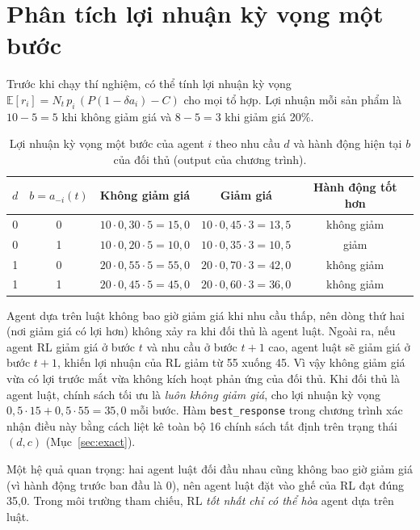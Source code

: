 \documentclass[12pt,a4paper]{report}
\begin{document}
\section{Phân tích lợi nhuận kỳ vọng một bước}
Trước khi chạy thí nghiệm, có thể tính lợi nhuận kỳ vọng
$\mathbb E[r_i]=N_t\,p_i\,(P(1-\delta a_i)-C)$ cho mọi tổ hợp. Lợi nhuận mỗi sản
phẩm là $10-5=5$ khi không giảm giá và $8-5=3$ khi giảm giá 20\%.

\begin{table}[H]
\centering
\small
\caption{Lợi nhuận kỳ vọng một bước của agent $i$ theo nhu cầu $d$ và hành động hiện tại $b$ của đối thủ (output của chương trình).}
\label{tab:onestep}
\begin{tabular}{ccccc}
\toprule
$d$ & $b=a_{-i}(t)$ & Không giảm giá & Giảm giá & Hành động tốt hơn \\
\midrule
0 & 0 & $10\cdot0{,}30\cdot5=15{,}0$ & $10\cdot0{,}45\cdot3=13{,}5$ & không giảm \\
0 & 1 & $10\cdot0{,}20\cdot5=10{,}0$ & $10\cdot0{,}35\cdot3=10{,}5$ & giảm \\
1 & 0 & $20\cdot0{,}55\cdot5=55{,}0$ & $20\cdot0{,}70\cdot3=42{,}0$ & không giảm \\
1 & 1 & $20\cdot0{,}45\cdot5=45{,}0$ & $20\cdot0{,}60\cdot3=36{,}0$ & không giảm \\
\bottomrule
\end{tabular}
\end{table}

Agent dựa trên luật không bao giờ giảm giá khi nhu cầu thấp, nên dòng thứ hai
(nơi giảm giá có lợi hơn) không xảy ra khi đối thủ là agent luật. Ngoài ra, nếu
agent RL giảm giá ở bước $t$ và nhu cầu ở bước $t+1$ cao, agent luật sẽ giảm giá ở
bước $t+1$, khiến lợi nhuận của RL giảm từ 55 xuống 45. Vì vậy không giảm giá vừa có
lợi trước mắt vừa không kích hoạt phản ứng của đối thủ. Khi đối thủ là agent luật,
chính sách tối ưu là \emph{luôn không giảm giá}, cho lợi nhuận kỳ vọng
$0{,}5\cdot15+0{,}5\cdot55=35{,}0$ mỗi bước. Hàm \texttt{best\_response} trong
chương trình xác nhận điều này bằng cách liệt kê toàn bộ 16 chính sách tất định
trên trạng thái $(d,c)$ (Mục~\ref{sec:exact}).

Một hệ quả quan trọng: hai agent luật đối đầu nhau cũng không bao giờ giảm giá (vì
hành động trước ban đầu là 0), nên agent luật đặt vào ghế của RL đạt đúng 35{,}0.
Trong môi trường tham chiếu, RL \emph{tốt nhất chỉ có thể hòa} agent dựa trên luật.

\end{document}
